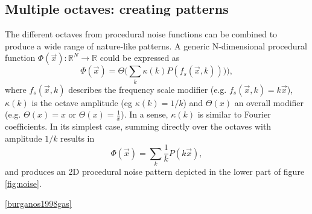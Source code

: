 \documentclass[aps,pre,twocolumn,letterpaper,floatfix,showpacs]{revtex4}
\begin{document}
\subsection{Multiple octaves: creating patterns}
\label{sec:octaves}
The different octaves from procedural noise functions can be combined
to produce a wide range of nature-like patterns. A generic
N-dimensional procedural function $\Phi(\vec x): \mathbb R^N \to
\mathbb R$ could be expressed as
\begin{equation}
\label{eq:procedural}
 \Phi(\vec x) = \Theta \Big(\sum_k \kappa (k) P(  f_s (\vec x,k) )) \Big),
 \end{equation}
where $f_s(\vec x,k)$ describes the frequency scale modifier (e.g. $f_s(\vec x,k) =
k\vec x$), $\kappa(k)$ is the octave amplitude (eg $\kappa(k) = 1/k$)
and $\Theta(x)$ an overall modifier (e.g. $\Theta(x) = x$ or
$\Theta(x) = \frac{1}{x}$). In a sense, $\kappa(k)$ is similar to Fourier coefficients. 
In its simplest case, summing directly
over the octaves with amplitude $1/k$ results in 
\begin{equation}
\label{eq:perlinlinear}
 \Phi(\vec x) = \sum_k \frac{1}{k} P( k\vec x), 
\end{equation}
and produces an 2D procedural noise pattern depicted in the lower
part of figure \ref{fig:noise}. 




\ref{burganos1998gas}
\end{document}
